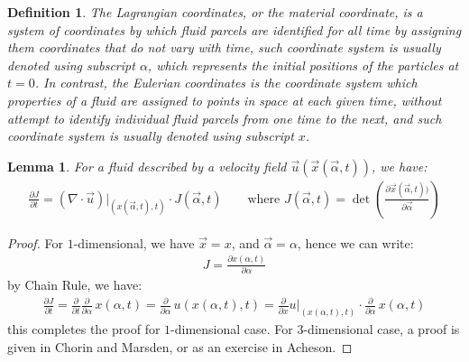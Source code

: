 \documentclass[11pt]{book}
\theoremstyle{break}
\theoremstyle{break}
\newtheorem{lem}{Lemma}[thm]
\newtheorem{defn}{Definition}[corL]
\begin{document}
\begin{defn}
The Lagrangian coordinates, or the material coordinate, is a system of coordinates by which fluid parcels are identified for all time by assigning them coordinates that do not vary with time, such coordinate system is usually denoted using subscript $\alpha$, which represents the initial positions of the particles at $t=0$. In contrast, the Eulerian coordinates is the coordinate system which properties of a fluid are assigned to points in space at each given time, without attempt to identify individual fluid parcels from one time to the next, and such coordinate system is usually denoted using subscript $x$. 
\end{defn}

\begin{lem}
For a fluid described by a velocity field $\vec{u}(\vec{x}(\vec{\alpha},t))$, we have: 
\begin{align*}
\frac{\partial J}{\partial t} = (\nabla \cdot \vec{u}) | _{(x(\vec{\alpha}, t) ,t) }\cdot J(\vec{\alpha},t) \qquad \text{where }J(\vec{\alpha},t)=\det\left(\frac{\partial \vec{x}(\vec{\alpha},t))}{\partial \vec{\alpha}}\right) 
\end{align*}
\end{lem}
\begin{proof}
For $1$-dimensional, we have $\vec{x} = x$, and $\vec{\alpha} = \alpha$, hence we can write:
\begin{align*}
J = \frac{\partial x(\alpha,t)}{\partial \alpha}
\end{align*}
by Chain Rule, we have:
\begin{align*}
\frac{\partial J}{\partial t} = \frac{\partial }{\partial t}\frac{\partial }{\partial \alpha} \,x(\alpha,t) = \frac{\partial }{\partial \alpha} \,u (x(\alpha,t),t) = \frac{\partial}{\partial x} u|_{(x(\alpha,t),t)} \cdot \frac{\partial}{\partial \alpha}\, x(\alpha,t) 
\end{align*}
this completes the proof for $1$-dimensional case. For $3$-dimensional case, a proof is given in Chorin and Marsden, or as an exercise in Acheson. 
\end{proof}
\end{document}
